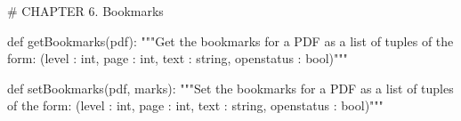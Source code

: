# CHAPTER 6. Bookmarks

def getBookmarks(pdf):
    """Get the bookmarks for a PDF as a list of tuples of the form:
    (level : int, page : int, text : string, openstatus : bool)"""

def setBookmarks(pdf, marks):
    """Set the bookmarks for a PDF as a list of tuples of the form:
    (level : int, page : int, text : string, openstatus : bool)"""
